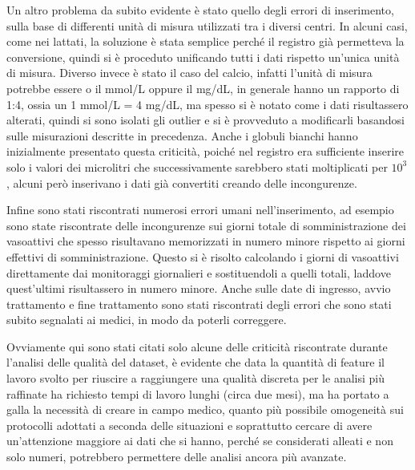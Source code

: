 Un altro problema da subito evidente è stato quello degli errori di inserimento, sulla base di differenti unità di misura utilizzati tra i diversi centri. In alcuni casi, come nei lattati, la soluzione è stata semplice perché il registro già permetteva la conversione, quindi si è proceduto unificando tutti i dati rispetto un'unica unità di misura.
Diverso invece è stato il caso del calcio, infatti l'unità di misura potrebbe essere o il mmol/L oppure il mg/dL, in generale hanno un rapporto di 1:4, ossia un 1 mmol/L = 4 mg/dL, ma spesso si è notato come i dati risultassero alterati, quindi si sono isolati gli outlier e si è provveduto a modificarli basandosi sulle misurazioni descritte in precedenza.
Anche i globuli bianchi hanno inizialmente presentato questa criticità, poiché nel registro era sufficiente inserire solo i valori dei microlitri che successivamente sarebbero stati moltiplicati per $10^3$, alcuni però inserivano i dati già convertiti creando delle incongurenze.

Infine sono stati riscontrati numerosi errori umani nell'inserimento, ad esempio sono state riscontrate delle incongurenze sui giorni totale di somministrazione dei vasoattivi che spesso risultavano memorizzati in numero minore rispetto ai giorni effettivi di somministrazione. Questo si è risolto calcolando i giorni di vasoattivi direttamente dai monitoraggi giornalieri e sostituendoli a quelli totali, laddove quest'ultimi risultassero in numero minore. 
Anche sulle date di ingresso, avvio trattamento e fine trattamento sono stati riscontrati degli errori che sono stati subito segnalati ai medici, in modo da poterli correggere.

Ovviamente qui sono stati citati solo alcune delle criticità riscontrate durante l'analisi delle qualità del dataset, è evidente che data la quantità di feature il lavoro svolto per riuscire a raggiungere una qualità discreta per le analisi più raffinate ha richiesto tempi di lavoro lunghi (circa due mesi), ma ha portato a galla la necessità di creare in campo medico, quanto più possibile omogeneità sui protocolli adottati a seconda delle situazioni e soprattutto cercare di avere un'attenzione maggiore ai dati che si hanno, perché se considerati alleati e non solo numeri, potrebbero permettere delle analisi ancora più avanzate. 







